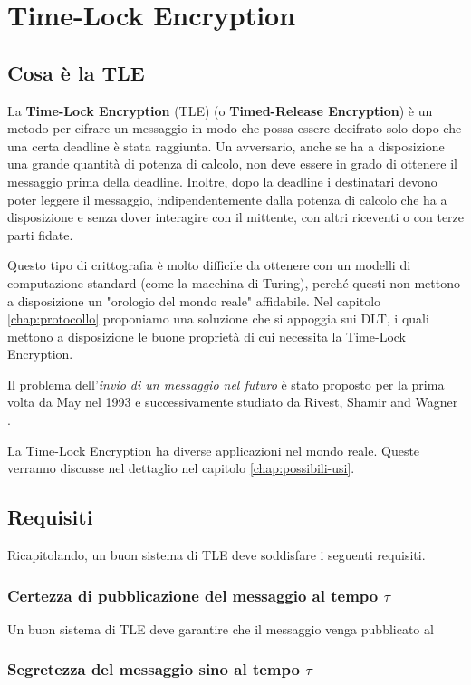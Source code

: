 \chapter{Time-Lock Encryption}

\section{Cosa è la TLE}
La \textbf{Time-Lock Encryption} (TLE) (o \textbf{Timed-Release Encryption})
è un metodo per cifrare un messaggio in modo che possa
essere decifrato solo dopo che una certa deadline è stata raggiunta.
Un avversario, anche se ha a disposizione una grande quantità di potenza di calcolo,
non deve essere in grado di ottenere il messaggio prima della deadline.
Inoltre, dopo la deadline i destinatari devono poter leggere il messaggio,
indipendentemente dalla potenza di calcolo che ha a disposizione e
senza dover interagire con il mittente,
con altri riceventi o con terze parti fidate.

Questo tipo di crittografia è molto difficile da ottenere con un modelli
di computazione standard (come la macchina di Turing), perché questi non mettono
a disposizione un "orologio del mondo reale" affidabile.
Nel capitolo \ref{chap:protocollo} proponiamo una soluzione che si appoggia sui DLT,
i quali mettono a disposizione
le buone proprietà di cui necessita la Time-Lock Encryption.

Il problema dell'\textit{invio di un messaggio nel futuro} è stato proposto per la prima volta
da May \cite{May:time-released-crypto} nel 1993 e
successivamente studiato da Rivest, Shamir and Wagner \cite{Rivest96time-lockpuzzles}.

La Time-Lock Encryption ha diverse applicazioni nel mondo reale. Queste verranno
discusse nel dettaglio nel capitolo \ref{chap:possibili-usi}.

\section{Requisiti}
Ricapitolando, un buon sistema di TLE deve soddisfare i seguenti requisiti.

\subsection{Certezza di pubblicazione del messaggio al tempo $ \tau $}
Un buon sistema di TLE deve garantire che il messaggio venga pubblicato al

\subsection{Segretezza del messaggio sino al tempo $ \tau $}
\label{subsec:segretezza-tle}


